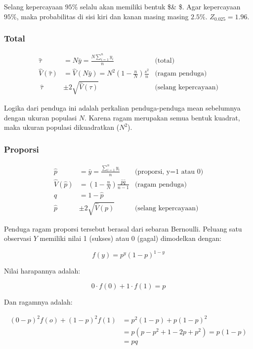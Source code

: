 \documentclass[
  letterpaper,
  DIV=11,
  numbers=noendperiod]{scrreprt}
\begin{document}
Selang kepercayaan \(95\%\) selalu akan memiliki bentuk
\$\hat{\mu}\& \$. Agar kepercayaan \(95\%\),
maka probabilitas di sisi kiri dan kanan masing masing \(2.5\%\).
\(Z_{0.025}=1.96\).

\hypertarget{total}{%
\subsubsection{Total}\label{total}}

\[
\begin{aligned}
\hat{\tau}&=N\bar{y}=\frac{N\sum_{i=1}^n y_i}{n} & \text{(total)}\\
\hat{V}(\hat{\tau})&=\hat{V}(N\bar{y})=N^2\left(1-\frac{n}{N}\right)\frac{s^2}{n}&\text{(ragam penduga)}\\\
\hat{\tau}&\pm2\sqrt{\hat{V}(\tau)} & \text{(selang kepercayaan)}
\end{aligned}
\]

Logika dari penduga ini adalah perkalian penduga-penduga mean sebelumnya
dengan ukuran populasi \(N\). Karena ragam merupakan semua bentuk
kuadrat, maka ukuran populasi dikuadratkan (\(N^2\)).

\hypertarget{proporsi}{%
\subsubsection{Proporsi}\label{proporsi}}

\[
\begin{aligned}
\hat{p}&=\bar{y}=\frac{\sum_{i=1}^n y_i}{n} & \text{(proporsi, y=1 atau 0)}\\
\hat{V}(\hat{p})&=\left(1-\frac{n}{N}\right)\frac{\hat{p}\hat{q}}{n-1}&\text{(ragam penduga)}\\
\hat{q}&=1-\hat{p}\\
\hat{p}&\pm2\sqrt{\hat{V}(p)} & \text{(selang kepercayaan)}
\end{aligned}
\]

Penduga ragam proporsi tersebut berasal dari sebaran Bernoulli. Peluang
satu observasi \(Y\) memiliki nilai 1 (sukses) atau 0 (gagal) dimodelkan
dengan:

\[
f(y)=p^{y}(1-p)^{1-y}
\]

Nilai harapannya adalah:

\[
0\cdot f(0)+1\cdot f(1)=p
\]

Dan ragamnya adalah:

\[
\begin{aligned}
(0-p)^2 f(o)+(1-p)^2f(1)&=p^2(1-p)+p(1-p)^2\\ 
&=p(p-p^2+1-2p+p^2)=p(1-p)\\ 
&=pq
\end{aligned}
\]
\end{document}
